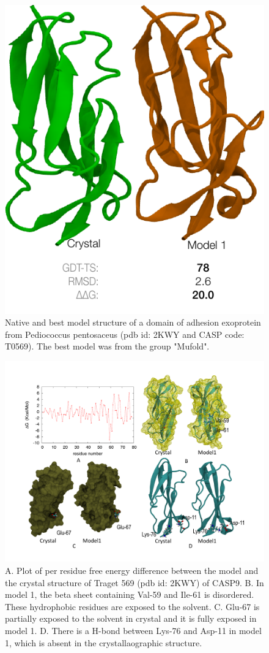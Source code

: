 \documentclass[12pt]{article}
\begin{document}
\begin{figure}
\begin{center}
\includegraphics[width=3.2 in,height=3.8 in]{T0569.pdf}
\end{center}
\caption{Native and best model structure of a domain of adhesion exoprotein from Pediococcus pentosaceus (pdb id: 2KWY and CASP code: T0569).
The best model was from the group "Mufold".}
\label{fig:T0569}
\end{figure}

\begin{figure}
\begin{center}
\includegraphics[width=5 in,height=4 in]{Target_569_per_residue.pdf}
\end{center}
\caption{A. Plot of per residue free energy difference between the model and the crystal structure of Traget 569 (pdb id: 2KWY) of CASP9.
B. In model 1, the beta sheet containing Val-59 and Ile-61 is disordered. These hydrophobic residues are exposed to the solvent.
C. Glu-67 is partially exposed to the solvent in crystal and it is fully exposed in model 1.
D. There is a H-bond between Lys-76 and Asp-11 in model 1, which is absent in the crystallaographic structure.}
\label{fig:T0569_per_residue}
\end{figure}
\end{document}

